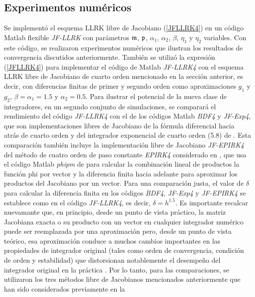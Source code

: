 \subsection{Experimentos numéricos}
Se implementó el esquema LLRK libre de Jacobiano (\ref{JFLLRK4}) en un código Matlab flexible \textit{JF-LLRK} con parámetros $\mathfrak{m}$, $\mathfrak{p}$, $\alpha_1$, $\alpha_2$, $\beta$, $\eta_1$ y $\eta_2$ variables. Con este código, se realizaron experimentos numéricos que ilustran los resultados de convergencia discutidos anteriormente. También se utilizó la expresión (\ref{JFLLRK4}) para implementar el código de Matlab \textit{JF-LLRK4} con el esquema LLRK libre de Jacobiano de cuarto orden mencionado en la sección anterior, es decir, con diferencias finitas de primer y segundo orden como aproximaciones $g_1$ y $g_2$, $\beta=\alpha_1=1.5$ y $\alpha_2=0.5$. Para ilustrar el potencial de la nueva clase de integradores, en un segundo conjunto de simulaciones, se comparará el rendimiento del código \textit{JF-LLRK4} con el de los códigos Matlab \textit{BDF4} y \textit{JF-Exp4}, que son implementaciones libres de Jacobiano de la fórmula diferencial hacia atrás de cuarto orden \cite{hairer1993solving} y del integrador exponencial de cuarto orden (5.8) de \cite{hochbruck1998exponential}. Esta comparación también incluye la implementación libre de Jacobiano \textit{JF-EPIRK4} del método de cuatro orden de paso constante \textit{EPIRK4} \cite{rainwater2016new} considerado en \cite{einkemmer2017performance}, que usa el código Matlab \textit {phipm} de \cite{niesen2012algorithm} para calcular la combinación lineal de productos  la función phi por vector y la diferencia finita hacia adelante para aproximar los productos del Jacobiano por un vector. Para una comparación justa, el valor de $\delta$ para calcular la diferencia finita en los códigos \textit{BDF4}, \textit{JF-Exp4} y \textit{JF-EPIRK4} se establece como en el código \textit {JF-LLRK4}, es decir, $\delta=h^{1.5}$. Es importante recalcar nuevamante que, en principio, desde un punto de vista práctico, la matriz Jacobiana exacta o su producto con un vector en cualquier integrador numérico puede ser reemplazada por una aproximación pero, desde un punto de vista teórico, esa aproximación conduce a muchos cambios importantes en las propiedades de integrador original (tales como orden de convergencia, condición de orden y estabilidad) que distorsionan notablemente el desempeño del integrador original en la práctica \cite{hairer1993solving,hochbruck1998exponential, tranquilli2014rosenbrock}. Por lo tanto, para las comparaciones, se utilizaron los tres métodos libre de Jacobianos mencionados anteriormente que han sido considerados previamente en la 